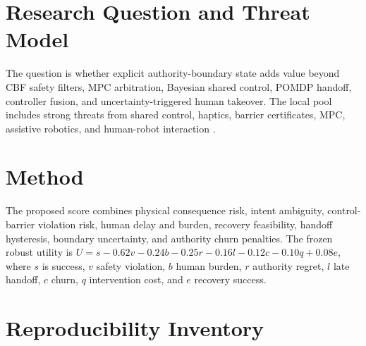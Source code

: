 \documentclass{article}
\begin{document}
\section{Research Question and Threat Model}

The question is whether explicit authority-boundary state adds value beyond CBF safety filters, MPC arbitration, Bayesian shared control, POMDP handoff, controller fusion, and uncertainty-triggered human takeover. The local pool includes strong threats from shared control, haptics, barrier certificates, MPC, assistive robotics, and human-robot interaction \citep{pool90_01,pool90_02,pool90_03,pool90_04,pool90_05,pool90_06,pool90_07,pool90_08,pool90_09,pool90_10,pool90_11,pool90_12,pool90_13,pool90_14,pool90_15,pool90_16,pool90_17,pool90_18,pool90_19,pool90_20}.

\section{Method}

The proposed score combines physical consequence risk, intent ambiguity, control-barrier violation risk, human delay and burden, recovery feasibility, handoff hysteresis, boundary uncertainty, and authority churn penalties. The frozen robust utility is $U=s-0.62v-0.24b-0.25r-0.16l-0.12c-0.10q+0.08e$, where $s$ is success, $v$ safety violation, $b$ human burden, $r$ authority regret, $l$ late handoff, $c$ churn, $q$ intervention cost, and $e$ recovery success.

\section{Reproducibility Inventory}
\end{document}
